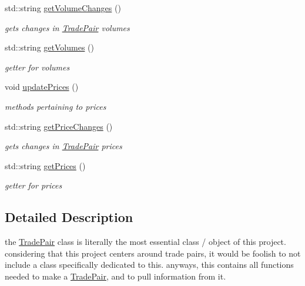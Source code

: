 \begin{DoxyCompactItemize}
std\+::string \mbox{\hyperlink{class_trade_pair_ac9f8868c84a2549662b8b2414ea294ed}{get\+Volume\+Changes}} ()
\begin{DoxyCompactList}\small\item\em gets changes in \mbox{\hyperlink{class_trade_pair}{Trade\+Pair}} volumes \end{DoxyCompactList}\item 
\mbox{\label{class_trade_pair_a2b48831f54361403f2a8b0b9fbe1fcf4}} 
std\+::string \mbox{\hyperlink{class_trade_pair_a2b48831f54361403f2a8b0b9fbe1fcf4}{get\+Volumes}} ()
\begin{DoxyCompactList}\small\item\em getter for volumes \end{DoxyCompactList}\item 
void \mbox{\hyperlink{class_trade_pair_a50360ccee465b011bfe4be572cd364ba}{update\+Prices}} ()
\begin{DoxyCompactList}\small\item\em methods pertaining to prices \end{DoxyCompactList}\item 
\mbox{\label{class_trade_pair_abc87175d644ead3da044a5a018c6496e}} 
std\+::string \mbox{\hyperlink{class_trade_pair_abc87175d644ead3da044a5a018c6496e}{get\+Price\+Changes}} ()
\begin{DoxyCompactList}\small\item\em gets changes in \mbox{\hyperlink{class_trade_pair}{Trade\+Pair}} prices \end{DoxyCompactList}\item 
\mbox{\label{class_trade_pair_a41731ce345d7d154424cd1bb6d8badbc}} 
std\+::string \mbox{\hyperlink{class_trade_pair_a41731ce345d7d154424cd1bb6d8badbc}{get\+Prices}} ()
\begin{DoxyCompactList}\small\item\em getter for prices \end{DoxyCompactList}\end{DoxyCompactItemize}


\subsection{Detailed Description}
the \mbox{\hyperlink{class_trade_pair}{Trade\+Pair}} class is literally the most essential class / object of this project. considering that this project centers around trade pairs, it would be foolish to not include a class specifically dedicated to this. anyways, this contains all functions needed to make a \mbox{\hyperlink{class_trade_pair}{Trade\+Pair}}, and to pull information from it. 

